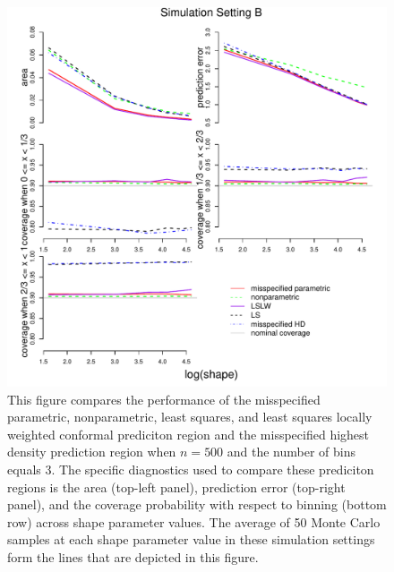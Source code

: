 \documentclass[11pt]{article}\usepackage[]{graphicx}\usepackage[]{color}
\makeatletter
\def\maxwidth{ %
  \ifdim\Gin@nat@width>\linewidth
    \linewidth
  \else
    \Gin@nat@width
  \fi
}
\newenvironment{knitrout}{}{} %
\makeatother
\begin{document}
\newpage
\begin{figure}[h!]
\begin{center}
\begin{knitrout}
\color{fgcolor}
\includegraphics[width=\maxwidth]{figure/Fig-misspec-500-1} 

\end{knitrout}
\end{center}
\caption{This figure compares the performance of the 
  misspecified parametric,
  nonparametric,
  least squares, and 
  least squares locally weighted conformal prediciton region and the 
  misspecified highest density prediction region when $n = 500$ and the 
  number of bins equals 3.  
  The specific diagnostics used to compare these prediciton regions is the 
    area (top-left panel),
    prediction error (top-right panel), and
    the coverage probability with respect to binning (bottom row) 
    across shape parameter values.
  The average of 50 Monte Carlo samples at each shape parameter value in 
  these simulation settings form the lines that are depicted in this figure.}
\label{Fig:misspec.500}
\end{figure}
\end{document}
